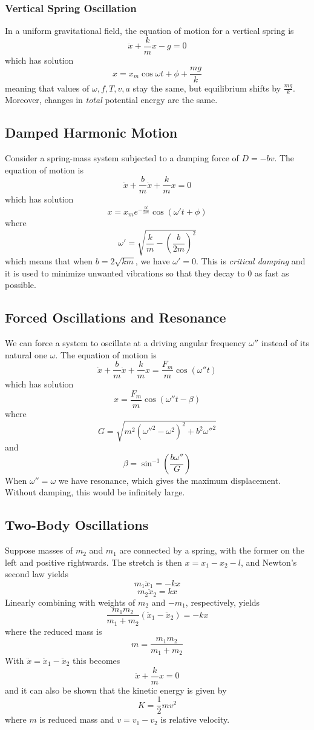 \documentclass[../PhysicsFormulae.tex]{subfiles}
\begin{document}
\subsubsection{Vertical Spring Oscillation}
In a uniform gravitational field, the equation of motion for a vertical spring is
\[ \ddot{x} + \frac{k}{m}x - g = 0 \]
which has solution
\[ x = x_m \cos{\omega t + \phi} + \frac{mg}{k} \]
meaning that values of $\omega, f, T, v, a$ stay the same, but equilibrium shifts by $\frac{mg}{k}$. Moreover, changes in \textit{total} potential energy are the same. 

\subsection{Damped Harmonic Motion}
Consider a spring-mass system subjected to a damping force of $D=-bv$. The equation of motion is
\[ \ddot{x} + \frac{b}{m}\dot{x} + \frac{k}{m}x = 0 \]
which has solution
\[ x = x_m e^{-\frac{bt}{2m}}\cos(\omega't + \phi) \]
where
\[ \omega' = \sqrt{\frac{k}{m} - \left( \frac{b}{2m} \right)^2} \]
which means that when $b = 2\sqrt{km}$, we have $\omega' = 0$. This is \textit{critical damping} and it is used to minimize unwanted vibrations so that they decay to 0 as fast as possible.

\subsection{Forced Oscillations and Resonance} 
We can force a system to oscillate at a driving angular frequency $\omega''$ instead of its natural one $\omega$. The equation of motion is
\[ \ddot{x} + \frac{b}{m}\dot{x} + \frac{k}{m}x = \frac{F_m}{m} \cos(\omega''t) \]
which has solution
\[ x = \frac{F_m}{m} \cos(\omega''t - \beta) \]
where
\[ G = \sqrt{m^2(\omega''^2-\omega^2)^2 + b^2 \omega''^2} \]
and 
\[ \beta = \sin^{-1}\left(\frac{b\omega''}{G}\right) \]
When $\omega'' = \omega$ we have resonance, which gives the maximum displacement. Without damping, this would be infinitely large. 

\subsection{Two-Body Oscillations}
Suppose masses of $m_2$ and $m_1$ are connected by a spring, with the former on the left and positive rightwards. The stretch is then $x=x_1-x_2-l$, and Newton's second law yields
\[ m_1\ddot{x}_1 = -kx \]
\[ m_2\ddot{x}_2 = kx \]
Linearly combining with weights of $m_2$ and $-m_1$, respectively, yields
\[ \frac{m_1m_2}{m_1+m_2}(\ddot{x}_1 - \ddot{x}_2) = -kx \]
where the reduced mass is 
\[ m = \frac{m_1m_2}{m_1+m_2} \]
With $\ddot{x}=\ddot{x}_1-\ddot{x}_2$ this becomes
\[ \ddot{x} + \frac{k}{m}x = 0 \]
and it can also be shown that the kinetic energy is given by 
\[ K = \frac{1}{2}mv^2 \]
where $m$ is reduced mass and $v=v_1-v_2$ is relative velocity.
\end{document}
